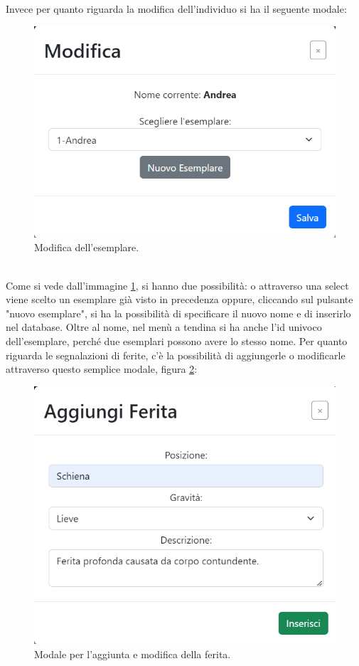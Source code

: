 \documentclass[a4paper,final,12pt]{report}
\begin{document}
\newpage
Invece per quanto riguarda la modifica dell'individuo si ha il seguente modale:
\begin{figure}[hbtp]
\centering
\includegraphics[scale=0.90]{img_concettuale/modificaNome.png}
\caption{Modifica dell'esemplare.}
\label{figura:modificanomeesemplareonline}
\end{figure}
\\Come si vede dall'immagine \ref{figura:modificanomeesemplareonline}, si hanno due possibilità: o attraverso una select viene scelto un esemplare già visto in precedenza oppure, cliccando sul pulsante "nuovo esemplare", si ha la possibilità di specificare il nuovo nome e di inserirlo nel database. Oltre al nome, nel menù a tendina si ha anche l'id univoco dell'esemplare, perché due esemplari possono avere lo stesso nome. 
\newpage
Per quanto riguarda le segnalazioni di ferite, c'è la possibilità di aggiungerle o modificarle attraverso questo semplice modale, figura \ref{figura:modavvaggiuntaemodifica}:
\begin{figure}[hbtp]
\centering
\includegraphics[scale=0.90]{img_concettuale/ferita.png}
\caption{Modale per l'aggiunta e modifica della ferita.}
\label{figura:modavvaggiuntaemodifica}
\end{figure}
\end{document}
